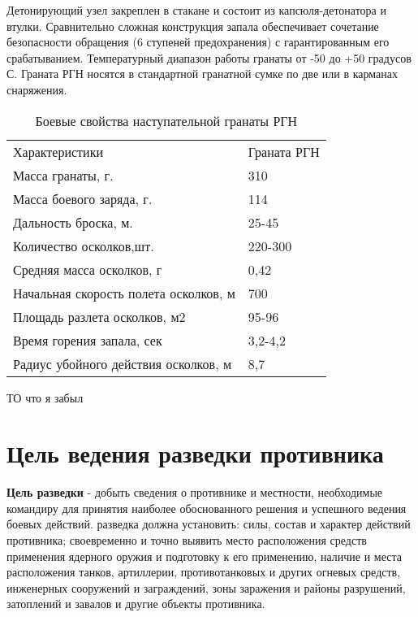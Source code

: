 \documentclass[12pt,a4paper]{report}
\begin{document}
Детонирующий узел закреплен в стакане и состоит из капсюля-детонатора и втулки. Сравнительно сложная конструкция запала обеспечивает сочетание безопасности обращения (6 ступеней предохранения) с гарантированным его срабатыванием. Температурный диапазон работы гранаты от -50 до +50 градусов С. Граната РГН носятся в стандартной гранатной сумке по две или в карманах снаряжения.
\begin{table}[h!]
	\caption{Боевые свойства наступательной  гранаты РГН}
	\label{tabular:RGN}
	\begin{center}
		\begin{tabular}{|l|l|}
			\hline
			\rowcolor[gray]{.9} Характеристики &  Граната РГН\\
			Масса гранаты, г.	& 310\\
			Масса боевого заряда, г.	& 114\\
			Дальность броска, м.	& 25-45\\
			Количество осколков,шт.  & 220-300\\
			Средняя масса осколков, г   & 0,42 \\
			Начальная скорость полета осколков, м &700\\
			Площадь разлета осколков, м2      &95-96 \\
			Время горения запала, сек & 3,2-4,2\\
			Радиус убойного действия осколков, м & 8,7\\
			\hline
		\end{tabular}
	\end{center}
\end{table}



ТО что я забыл
\section{Цель ведения разведки противника}
\textbf{Цель разведки} - добыть сведения о противнике и местности, необходимые командиру для принятия наиболее обоснованного решения и успешного ведения боевых действий. разведка должна установить: силы, состав и характер действий противника; своевременно и точно выявить место расположения средств применения ядерного оружия и подготовку к его применению, наличие и места расположения танков, артиллерии, противотанковых и других огневых средств, инженерных сооружений и заграждений, зоны заражения и районы разрушений, затоплений и завалов и другие объекты противника.
\end{document}
